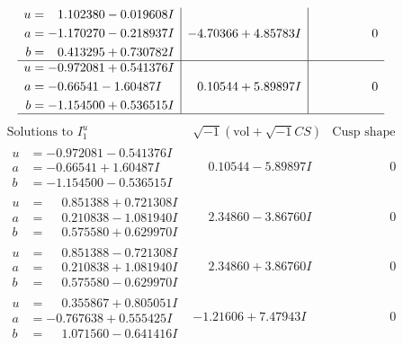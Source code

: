 \documentclass[1p]{elsarticle_modified}
\theoremstyle{definition}
\newcommand{\I}{\sqrt{-1}}
\begin{document}
$$\begin{array}{c|c|c}
\begin{aligned}
u &= \phantom{-}1.102380 - 0.019608 I \\
a &= -1.170270 - 0.218937 I \\
b &= \phantom{-}0.413295 + 0.730782 I\end{aligned}
 & -4.70366 + 4.85783 I & \phantom{-0.000000 } 0 \\ \hline\begin{aligned}
u &= -0.972081 + 0.541376 I \\
a &= -0.66541 - 1.60487 I \\
b &= -1.154500 + 0.536515 I\end{aligned}
 & \phantom{-}0.10544 + 5.89897 I & \phantom{-0.000000 } 0\\
 \hline 
 \end{array}$$\newpage$$\begin{array}{c|c|c}  
\text{Solutions to }I^u_{1}& \I (\text{vol} + \sqrt{-1}CS) & \text{Cusp shape}\\
 \hline 
\begin{aligned}
u &= -0.972081 - 0.541376 I \\
a &= -0.66541 + 1.60487 I \\
b &= -1.154500 - 0.536515 I\end{aligned}
 & \phantom{-}0.10544 - 5.89897 I & \phantom{-0.000000 } 0 \\ \hline\begin{aligned}
u &= \phantom{-}0.851388 + 0.721308 I \\
a &= \phantom{-}0.210838 - 1.081940 I \\
b &= \phantom{-}0.575580 + 0.629970 I\end{aligned}
 & \phantom{-}2.34860 - 3.86760 I & \phantom{-0.000000 } 0 \\ \hline\begin{aligned}
u &= \phantom{-}0.851388 - 0.721308 I \\
a &= \phantom{-}0.210838 + 1.081940 I \\
b &= \phantom{-}0.575580 - 0.629970 I\end{aligned}
 & \phantom{-}2.34860 + 3.86760 I & \phantom{-0.000000 } 0 \\ \hline\begin{aligned}
u &= \phantom{-}0.355867 + 0.805051 I \\
a &= -0.767638 + 0.555425 I \\
b &= \phantom{-}1.071560 - 0.641416 I\end{aligned}
 & -1.21606 + 7.47943 I & \phantom{-0.000000 } 0 \\ \hline\begin{aligned}

\end{aligned}
\end{array}$$
\end{document}

